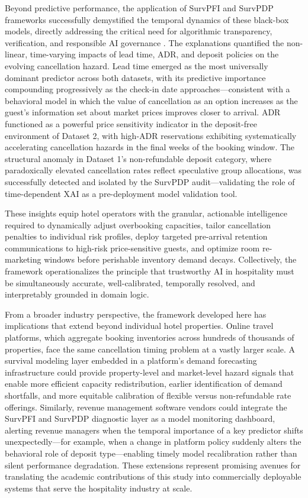 \documentclass[pdflatex,sn-mathphys-ay]{sn-jnl}
\theoremstyle{thmstyleone}%
\theoremstyle{thmstyletwo}%
\theoremstyle{thmstylethree}%
\begin{document}
Beyond predictive performance, the application of SurvPFI and SurvPDP frameworks successfully demystified the temporal dynamics of these black-box models, directly addressing the critical need for algorithmic transparency, verification, and responsible AI governance \citep{meske2022explainable}. The explanations quantified the non-linear, time-varying impacts of lead time, ADR, and deposit policies on the evolving cancellation hazard. Lead time emerged as the most universally dominant predictor across both datasets, with its predictive importance compounding progressively as the check-in date approaches—consistent with a behavioral model in which the value of cancellation as an option increases as the guest's information set about market prices improves closer to arrival. ADR functioned as a powerful price sensitivity indicator in the deposit-free environment of Dataset 2, with high-ADR reservations exhibiting systematically accelerating cancellation hazards in the final weeks of the booking window. The structural anomaly in Dataset 1's non-refundable deposit category, where paradoxically elevated cancellation rates reflect speculative group allocations, was successfully detected and isolated by the SurvPDP audit—validating the role of time-dependent XAI as a pre-deployment model validation tool.

These insights equip hotel operators with the granular, actionable intelligence required to dynamically adjust overbooking capacities, tailor cancellation penalties to individual risk profiles, deploy targeted pre-arrival retention communications to high-risk price-sensitive guests, and optimize room re-marketing windows before perishable inventory demand decays. Collectively, the framework operationalizes the principle that trustworthy AI in hospitality must be simultaneously accurate, well-calibrated, temporally resolved, and interpretably grounded in domain logic.

From a broader industry perspective, the framework developed here has implications that extend beyond individual hotel properties. Online travel platforms, which aggregate booking inventories across hundreds of thousands of properties, face the same cancellation timing problem at a vastly larger scale. A survival modeling layer embedded in a platform's demand forecasting infrastructure could provide property-level and market-level hazard signals that enable more efficient capacity redistribution, earlier identification of demand shortfalls, and more equitable calibration of flexible versus non-refundable rate offerings. Similarly, revenue management software vendors could integrate the SurvPFI and SurvPDP diagnostic layer as a model monitoring dashboard, alerting revenue managers when the temporal importance of a key predictor shifts unexpectedly—for example, when a change in platform policy suddenly alters the behavioral role of deposit type—enabling timely model recalibration rather than silent performance degradation. These extensions represent promising avenues for translating the academic contributions of this study into commercially deployable systems that serve the hospitality industry at scale.
\end{document}

